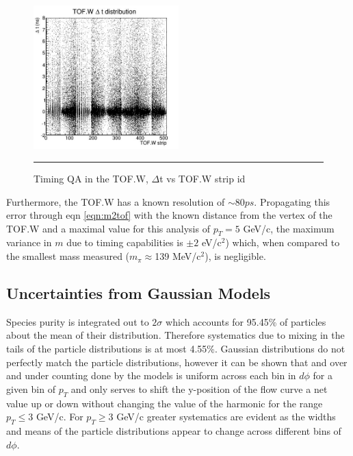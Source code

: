 \begin{figure}[htbp]
  \centering
    \includegraphics[width=0.5\textwidth]{evtQA/ttofwdist.JPG}
    \rule{35em}{0.5pt}
  \caption[Timing QA in the TOF.W]{Timing QA in the TOF.W, $\Delta$t vs TOF.W strip id}
  \label{fig:tofwdist}
\end{figure}

Furthermore, the TOF.W has a known resolution of $\sim 80 ps$. Propagating this error through eqn \ref{eqn:m2tof} with the known distance from the vertex of the TOF.W and a maximal value for this analysis of $p_T=5$ GeV/c, the maximum variance in $m$ due to timing capabilities is $\pm 2$ eV/c$^2$) which, when compared to the smallest mass measured ($m_{\pi}\approx$139 MeV/c$^2$), is negligible. 

\subsection{Uncertainties from Gaussian Models}
Species purity is integrated out to $2\sigma$ which accounts for 95.45\% of particles about the mean of their distribution. Therefore systematics due to mixing in the tails of the particle distributions is at most 4.55\%. Gaussian distributions do not perfectly match the particle distributions, however it can be shown that and over and under counting done by the models is uniform across each bin in $d\phi$ for a given bin of $p_T$ and only serves to shift the y-position of the flow curve a net value up or down without changing the value of the harmonic for the range $p_T \leq 3$ GeV/c. For $p_T \geq 3$ GeV/c greater systematics are evident as the widths and means of the particle distributions appear to change across different bins of $d\phi$. 

